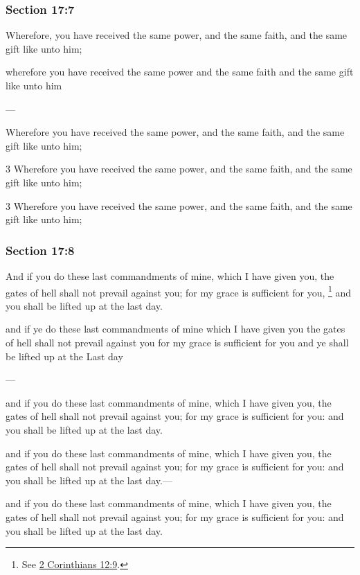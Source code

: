 	\subsubsection{Section 17:7} %
		\label{DC17-7}

		Wherefore, you have received the same power, and the same faith, and the same gift like unto him;

		\begin{framed}
		\scriptsize
			\begin{compactdesc}
				\item[JSP] wherefore you have received the same power and the same faith and the same gift like unto him 
				\item[BC] --- 
				\item[MA] Wherefore you have received the same power, and the same faith, and the same gift like unto him; 
				\item[DC 1835] 3 Wherefore you have received the same power, and the same faith, and the same gift like unto him; 
				\item[DC 1844] 3 Wherefore you have received the same power, and the same faith, and the same gift like unto him; 
			\end{compactdesc}
		\end{framed}

	\subsubsection{Section 17:8} %
		\label{DC17-8}

		And if you do these last commandments of mine, which I have given you, the gates of hell shall not prevail against you; for my grace is sufficient for you,%
			\footnote{%
				See \hyperref[2CORINTHIANS-12-9]{2 Corinthians 12:9}.
				}
		and you shall be lifted up at the last day.

		\begin{framed}
		\scriptsize
			\begin{compactdesc}
				\item[JSP] and if ye do these last commandments of mine which I have given you the gates of hell shall not prevail against you for my grace is sufficient for you and ye shall be lifted up at the Last day 
				\item[BC] --- 
				\item[MA] and if you do these last commandments of mine, which I have given you, the gates of hell shall not prevail against you; for my grace is sufficient for you: and you shall be lifted up at the last day. 
				\item[DC 1835] and if you do these last commandments of mine, which I have given you, the gates of hell shall not prevail against you; for my grace is sufficient for you: and you shall be lifted up at the last day.--- 
				\item[DC 1844] and if you do these last commandments of mine, which I have given you, the gates of hell shall not prevail against you; for my grace is sufficient for you: and you shall be lifted up at the last day. 
			\end{compactdesc}
		\end{framed}


